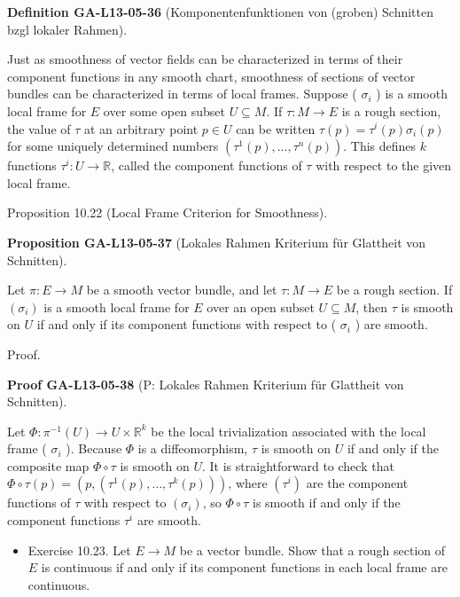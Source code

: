 \documentclass[10pt, letterpaper]{article}
\newcommand{\CustomHeading}[3]{%
  \par\medskip\noindent%
  \textbf{#1 #2} \textnormal{(#3)}.\enskip%
}
\newenvironment{DEF}[2]{\begin{unitbox}\CustomHeading{Definition}{#1}{#2}}{\end{unitbox}}
\newenvironment{PROP}[2]{\begin{unitbox}\CustomHeading{Proposition}{#1}{#2}}{\end{unitbox}}
\newenvironment{PROOF}[2]{\begin{unitbox}\CustomHeading{Proof}{#1}{#2}}{\end{unitbox}}
\begin{document}
\begin{DEF}{GA-L13-05-36}{Komponentenfunktionen von (groben) Schnitten bzgl lokaler Rahmen}
Just as smoothness of vector fields can be characterized in terms of their component functions in any smooth chart, smoothness of sections of vector bundles can be characterized in terms of local frames. Suppose ( $\sigma_{i}$ ) is a smooth local frame for $E$ over some open subset $U \subseteq M$. If $\tau: M \rightarrow E$ is a rough section, the value of $\tau$ at an arbitrary point $p \in U$ can be written $\tau(p)=\tau^{i}(p) \sigma_{i}(p)$ for some uniquely determined numbers $\left(\tau^{1}(p), \ldots, \tau^{n}(p)\right)$. This defines $k$ functions $\tau^{i}: U \rightarrow \mathbb{R}$, called the component functions of $\tau$ with respect to the given local frame.
\end{DEF}


Proposition 10.22 (Local Frame Criterion for Smoothness). 


\begin{PROP}{GA-L13-05-37}{Lokales Rahmen Kriterium für Glattheit von Schnitten}
Let $\pi: E \rightarrow M$ be a smooth vector bundle, and let $\tau: M \rightarrow E$ be a rough section. If $\left(\sigma_{i}\right)$ is a smooth local frame for $E$ over an open subset $U \subseteq M$, then $\tau$ is smooth on $U$ if and only if its component functions with respect to ( $\sigma_{i}$ ) are smooth.
\end{PROP}



Proof. 


\begin{PROOF}{GA-L13-05-38}{P: Lokales Rahmen Kriterium für Glattheit von Schnitten}
Let $\Phi: \pi^{-1}(U) \rightarrow U \times \mathbb{R}^{k}$ be the local trivialization associated with the local frame ( $\sigma_{i}$ ). Because $\Phi$ is a diffeomorphism, $\tau$ is smooth on $U$ if and only if the composite map $\Phi \circ \tau$ is smooth on $U$. It is straightforward to check that $\Phi \circ \tau(p)=\left(p,\left(\tau^{1}(p), \ldots, \tau^{k}(p)\right)\right)$, where $\left(\tau^{i}\right)$ are the component functions of $\tau$ with respect to $\left(\sigma_{i}\right)$, so $\Phi \circ \tau$ is smooth if and only if the component functions $\tau^{i}$ are smooth.
\begin{itemize}
  \item Exercise 10.23. Let $E \rightarrow M$ be a vector bundle. Show that a rough section of $E$ is continuous if and only if its component functions in each local frame are continuous.
\end{itemize}
\end{PROOF}
\end{document}
